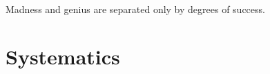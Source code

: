 \begin{savequote}[75mm]
Madness and genius are separated only by degrees of success. 
\end{savequote}

\chapter{Systematics}
\label{sec:systematics}
